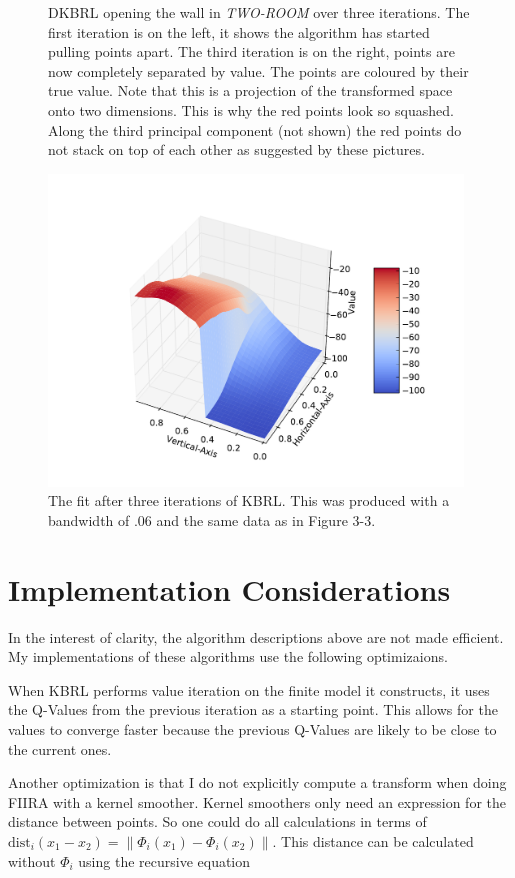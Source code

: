 \begin{figure}[!htb]
  \endminipage
\caption[DKBRL opening the wall in \textit{TWO-ROOM}]
{DKBRL opening the wall in \textit{TWO-ROOM} over three iterations.
The first iteration is on the left, it shows the algorithm has started pulling
points apart.
The third iteration is on the right, points are now completely separated by
value.
The points are coloured by their true value.
Note that this is a projection of the transformed space onto two dimensions.
This is why the red points look so squashed.
Along the third principal component (not shown) the red points do not
stack on top of each other as suggested by these pictures.}
\end{figure}

\begin{figure}[!!!ht]
  \centering
    \includegraphics[width=110mm]{figs/chap4/2rmdkb.pdf}
  \caption[DKBRL fit for \textit{TWO-ROOM}]{The fit after three iterations
of KBRL. This was produced with a bandwidth of .06 and the same data as
in Figure 3-3.}
\end{figure}

\section{Implementation Considerations}
In the interest of clarity,
the algorithm descriptions above are not made efficient.
My implementations of these algorithms use the following optimizaions.

When KBRL performs value iteration on the finite model it constructs,
it uses the Q-Values from the previous iteration as a starting point.
This allows for the values to converge faster because the previous
Q-Values are likely to be close to the current ones.

Another optimization is that I do not explicitly compute a transform when
doing FIIRA with a kernel smoother.
Kernel smoothers only need an expression for the distance between points.
So one could do all calculations in terms of
$\mathrm{dist}_i(x_1 - x_2) = \|\Phi_i(x_1) - \Phi_i(x_2)\|$.
This distance can be calculated without $\Phi_i$ using the recursive equation

